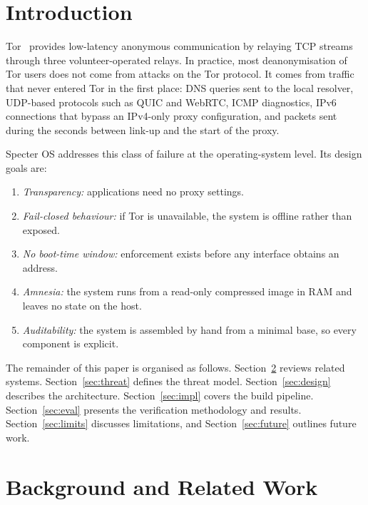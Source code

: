 \documentclass[10pt,twocolumn,a4paper]{article}
\begin{document}
\section{Introduction}
\label{sec:intro}

Tor~\cite{dingledine2004tor} provides low-latency anonymous
communication by relaying TCP streams through three volunteer-operated
relays. In practice, most deanonymisation of Tor users does not come
from attacks on the Tor protocol. It comes from traffic that never
entered Tor in the first place: DNS queries sent to the local resolver,
UDP-based protocols such as QUIC and WebRTC, ICMP diagnostics, IPv6
connections that bypass an IPv4-only proxy configuration, and packets
sent during the seconds between link-up and the start of the proxy.

Specter OS addresses this class of failure at the operating-system
level. Its design goals are:
\begin{enumerate}
  \item \emph{Transparency:} applications need no proxy settings.
  \item \emph{Fail-closed behaviour:} if Tor is unavailable, the system
        is offline rather than exposed.
  \item \emph{No boot-time window:} enforcement exists before any
        interface obtains an address.
  \item \emph{Amnesia:} the system runs from a read-only compressed
        image in RAM and leaves no state on the host.
  \item \emph{Auditability:} the system is assembled by hand from a
        minimal base, so every component is explicit.
\end{enumerate}

The remainder of this paper is organised as follows.
Section~\ref{sec:background} reviews related systems.
Section~\ref{sec:threat} defines the threat model.
Section~\ref{sec:design} describes the architecture.
Section~\ref{sec:impl} covers the build pipeline.
Section~\ref{sec:eval} presents the verification methodology and results.
Section~\ref{sec:limits} discusses limitations, and
Section~\ref{sec:future} outlines future work.

\section{Background and Related Work}
\label{sec:background}
\end{document}
